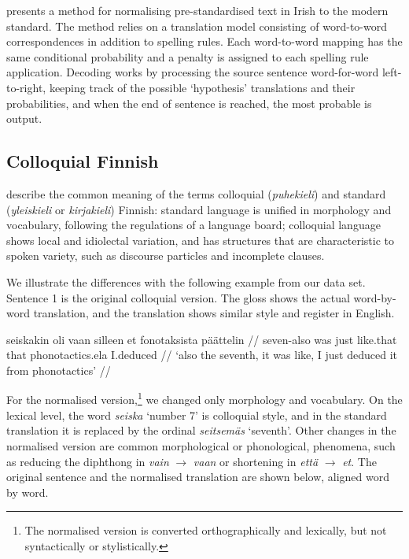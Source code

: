 \documentclass[11pt]{article}
\begin{document}
 presents a method for normalising pre-standardised text in Irish to 
the modern standard. The method relies on a translation model consisting of word-to-word 
correspondences in addition to spelling rules. Each word-to-word mapping has the same
conditional probability and a penalty is assigned to each spelling rule application. Decoding
works by processing the source sentence word-for-word left-to-right, keeping track of the 
possible `hypothesis' translations and their probabilities, and when the end of 
sentence is reached, the most probable is output.

\subsection{Colloquial Finnish}


 describe the common meaning of the terms colloquial (\emph{puhekieli}) and standard (\emph{yleiskieli} or \emph{kirjakieli}) Finnish: standard language is unified in morphology and vocabulary, following the regulations of a language board; colloquial language shows local and idiolectal variation, and has structures that are characteristic to spoken variety,  such as discourse particles and incomplete clauses. 




We illustrate the differences with the following example from our data set. Sentence 1 is the original colloquial version. The gloss shows the actual word-by-word translation, and the translation shows similar style and register in English.

\ex
\begingl
\gla seiskakin oli vaan silleen et fonotaksista p\"{a}\"{a}ttelin //
\glb seven-{\sc also} was just like.that that phonotactics.{\sc ela} I.deduced //
\glft `also the seventh, it was like, I just deduced it from phonotactics' //
\endgl
\xe


For the normalised version,\footnote{The normalised version is converted orthographically and lexically, but not syntactically or stylistically.} we changed only morphology and vocabulary. On the lexical level, the word \emph{seiska} `number 7' is colloquial style, and in the standard translation it is replaced by the ordinal \emph{seitsem\"{a}s} `seventh'.  Other changes in the normalised version are common morphological or phonological, phenomena, such as reducing the diphthong in \emph{vain} $\rightarrow$ \emph{vaan} or shortening in  \emph{ett\"{a}} $\rightarrow$ \emph{et}. The original sentence and the normalised translation are shown below, aligned word by word.
\end{document}

